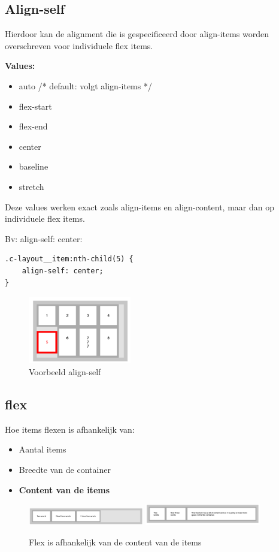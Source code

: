 \documentclass{article}
\newcommand{\bold}[1]{\textbf{#1}}
\begin{document}
\subsection{Align-self}
Hierdoor kan de alignment die is gespecificeerd door align-items worden overschreven voor individuele flex items.

\bold{Values:}
\begin{itemize}
    \item auto /* default: volgt align-items */
    \item flex-start
    \item flex-end
    \item center
    \item baseline
    \item stretch
\end{itemize}

Deze values werken exact zoals align-items en align-content, maar dan op individuele flex items.

Bv: align-self: center:

\begin{lstlisting}
.c-layout__item:nth-child(5) {
    align-self: center;
}
\end{lstlisting}

\begin{figure}[H]
    \centering
    \includegraphics[width=0.4\textwidth]{img/Screenshot_20200427_100049.png}
    \caption{Voorbeeld align-self}
\end{figure}

\subsection{flex}
Hoe items flexen is afhankelijk van:
\begin{itemize}
    \item Aantal items
    \item Breedte van de container
    \item \bold{Content van de items}
\end{itemize}

\begin{figure}[H]
    \centering
    \includegraphics[width=0.45\textwidth]{img/Screenshot_20200427_101021.png}
    \includegraphics[width=0.45\textwidth]{img/Screenshot_20200427_100955.png}
    \caption{Flex is afhankelijk van de content van de items}
\end{figure}
\end{document}
